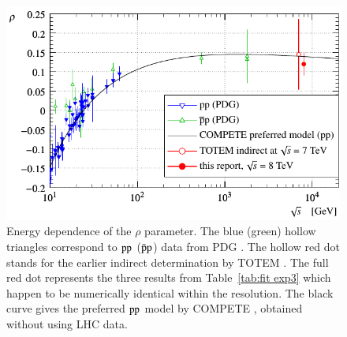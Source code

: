 \begin{figure}
\begin{center}
\includegraphics{fig/rho_s.pdf}
\caption{Energy dependence of the $\rho$ parameter. The blue (green) hollow triangles correspond to $\rm pp$ ($\rm \bar pp$) data from PDG \cite{pdg} . The hollow red dot stands for the earlier indirect determination by TOTEM \cite{epl101-tot}. The full red dot represents the three results from Table~\ref{tab:fit exp3} which happen to be numerically identical within the resolution. The black curve gives the preferred $\rm pp$ model by COMPETE \cite{compete}, obtained without using LHC data.
}%
\label{fig:rho cmp exp3}
\end{center}
\end{figure}
